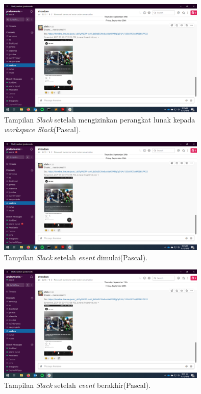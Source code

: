 \begin{figure}[h]
  \includegraphics[width=10cm]{./Gambar/PengujianPaPascal/Slack_After_Authorize_PL.png}
  \centering
  \caption{Tampilan \textit{Slack} setelah mengizinkan perangkat lunak kepada \textit{workspace Slack}(Pascal).}
  \label{fig:slack_after_auth_pascal}
\end{figure}

\begin{figure}[h]
  \includegraphics[width=10cm]{./Gambar/PengujianPaPascal/Slack_After.png}
  \centering
  \caption{Tampilan \textit{Slack} setelah \textit{event} dimulai(Pascal).}
  \label{fig:slack_after_pascal}
\end{figure}

\begin{figure}[h]
  \includegraphics[width=10cm]{./Gambar/PengujianPaPascal/Slack_After_Event_End.png}
  \centering
  \caption{Tampilan \textit{Slack} setelah \textit{event} berakhir(Pascal).}
  \label{fig:slack_after_event_end_pascal}
\end{figure}

